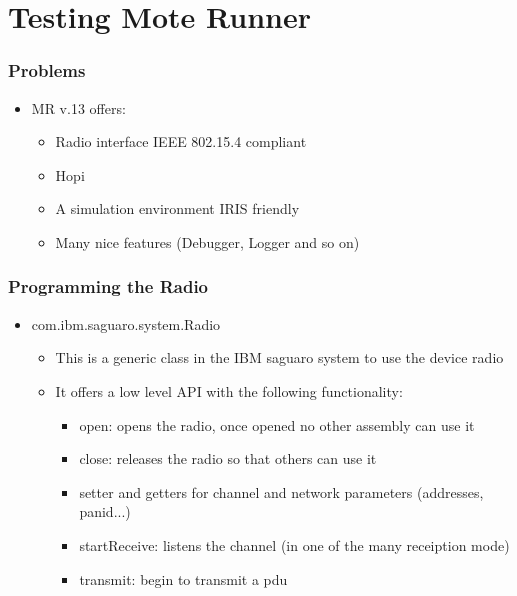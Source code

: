 \section{Testing Mote Runner}
\begin{frame}[fragile]
  \frametitle{Problems}
  \begin{itemize}
    \item MR v.13 offers:
    \begin{itemize}
    	\item Radio interface IEEE 802.15.4 compliant
    	\item Hopi
    	\item A simulation environment IRIS friendly
    	\item Many nice features (Debugger, Logger and so on)
    \end{itemize}
  \end{itemize}
\end{frame}

\begin{frame}[fragile]
  \frametitle{Programming the Radio}
  \begin{itemize}
    \item com.ibm.saguaro.system.Radio
    \begin{itemize}
    	\item This is a generic class in the IBM saguaro system to use the device radio
    	\item It offers a low level API with the following functionality:
    	\begin{itemize}
	  \item open: opens the radio, once opened no other assembly can use it
	  \item close: releases the radio so that others can use it
	  \item setter and getters for channel and network parameters (addresses, panid...)
	  \item startReceive: listens the channel (in one of the many receiption mode)
	  \item transmit: begin to transmit a pdu
    	\end{itemize}
    \end{itemize}
  \end{itemize}
\end{frame}

